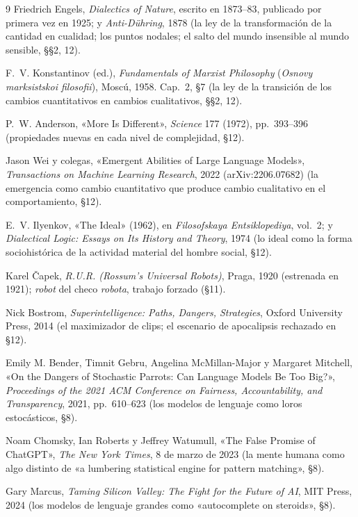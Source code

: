 \documentclass[11pt]{article}
\begin{document}
\begin{thebibliography}{9}
 Friedrich Engels, \textit{Dialectics of Nature},
escrito en 1873--83, publicado por primera vez en 1925; y
\textit{Anti-Dühring}, 1878 (la ley de la transformación de la cantidad
en cualidad; los puntos nodales; el salto del mundo insensible al mundo
sensible, §§2, 12).

 F.~V. Konstantinov (ed.),
\textit{Fundamentals of Marxist Philosophy} (\textit{Osnovy
marksistskoi filosofii}), Moscú, 1958. Cap.~2, §7 (la ley de la
transición de los cambios cuantitativos en cambios cualitativos, §§2,
12).

 P.~W. Anderson, «More Is Different»,
\textit{Science} 177 (1972), pp.~393--396 (propiedades nuevas en cada
nivel de complejidad, §12).

 Jason Wei y colegas, «Emergent Abilities of Large
Language Models», \textit{Transactions on Machine Learning Research},
2022 (arXiv:2206.07682) (la emergencia como cambio cuantitativo que
produce cambio cualitativo en el comportamiento, §12).

 E.~V. Ilyenkov, «The Ideal» (1962), en
\textit{Filosofskaya Entsiklopediya}, vol.~2; y \textit{Dialectical
Logic: Essays on Its History and Theory}, 1974 (lo ideal como la forma
sociohistórica de la actividad material del hombre social, §12).

 Karel \v{C}apek, \textit{R.U.R. (Rossum's Universal
Robots)}, Praga, 1920 (estrenada en 1921); \emph{robot} del checo
\emph{robota}, trabajo forzado (§11).

 Nick Bostrom, \textit{Superintelligence: Paths,
Dangers, Strategies}, Oxford University Press, 2014 (el maximizador de
clips; el escenario de apocalipsis rechazado en §12).

 Emily M. Bender, Timnit Gebru, Angelina
McMillan-Major y Margaret Mitchell, «On the Dangers of Stochastic
Parrots: Can Language Models Be Too Big?», \textit{Proceedings of the
2021 ACM Conference on Fairness, Accountability, and Transparency},
2021, pp.~610--623 (los modelos de lenguaje como loros estocásticos,
§8).

 Noam Chomsky, Ian Roberts y Jeffrey Watumull,
«The False Promise of ChatGPT», \textit{The New York Times}, 8 de marzo
de 2023 (la mente humana como algo distinto de «a lumbering statistical
engine for pattern matching», §8).

 Gary Marcus, \textit{Taming Silicon Valley: The
Fight for the Future of AI}, MIT Press, 2024 (los modelos de lenguaje
grandes como «autocomplete on steroids», §8).


\end{thebibliography}
\end{document}
